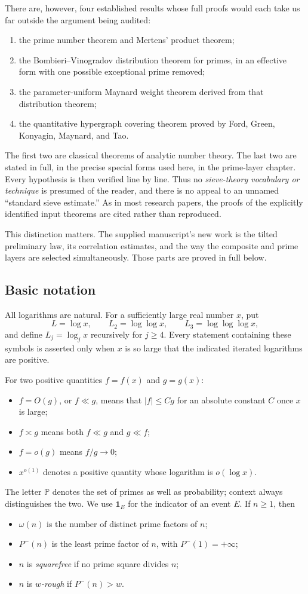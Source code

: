 \documentclass[10pt,letterpaper]{article}
\newcommand{\subheading}[1]{\subsection*{#1}\phantomsection\addcontentsline{toc}{subsection}{#1}}
\newcommand{\PP}{\mathbb{P}}
\newcommand{\ind}{\mathbf{1}}
\begin{document}
There are, however, four established results whose full proofs would each take us far outside the argument
being audited:
\begin{enumerate}
\item the prime number theorem and Mertens' product theorem;
\item the Bombieri--Vinogradov distribution theorem for primes, in an effective form with one possible exceptional
prime removed;
\item the parameter-uniform Maynard weight theorem derived from that distribution theorem;
\item the quantitative hypergraph covering theorem proved by Ford, Green, Konyagin, Maynard, and Tao.
\end{enumerate}
The first two are classical theorems of analytic number theory. The last two are stated in full, in the precise
special forms used here, in the prime-layer chapter. Every hypothesis is then verified line by line. Thus no
\emph{sieve-theory vocabulary or technique} is presumed of the reader, and there is no appeal to an unnamed ``standard
sieve estimate.'' As in most research papers, the proofs of the explicitly identified input theorems are cited
rather than reproduced.

This distinction matters. The supplied manuscript's new work is the tilted preliminary law, its correlation
estimates, and the way the composite and prime layers are selected simultaneously. Those parts are proved in
full below.

\subheading{Basic notation}
All logarithms are natural. For a sufficiently large real number $x$, put
\[
L=\log x,\qquad L_2=\log\log x,\qquad L_3=\log\log\log x,
\]
and define $L_j=\log_j x$ recursively for $j\ge4$. Every statement containing these symbols is asserted only when
$x$ is so large that the indicated iterated logarithms are positive.

For two positive quantities $f=f(x)$ and $g=g(x)$:
\begin{itemize}
\item $f=O(g)$, or $f\ll g$, means that $|f|\le Cg$ for an absolute constant $C$ once $x$ is large;
\item $f\asymp g$ means both $f\ll g$ and $g\ll f$;
\item $f=o(g)$ means $f/g\to0$;
\item $x^{o(1)}$ denotes a positive quantity whose logarithm is $o(\log x)$.
\end{itemize}
The letter $\PP$ denotes the set of primes as well as probability; context always distinguishes the two. We use
$\ind_E$ for the indicator of an event $E$. If $n\ge1$, then
\begin{itemize}
\item $\omega(n)$ is the number of distinct prime factors of $n$;
\item $P^-(n)$ is the least prime factor of $n$, with $P^-(1)=+\infty$;
\item $n$ is \emph{squarefree} if no prime square divides $n$;
\item $n$ is \emph{$w$-rough} if $P^-(n)>w$.
\end{itemize}
\end{document}
